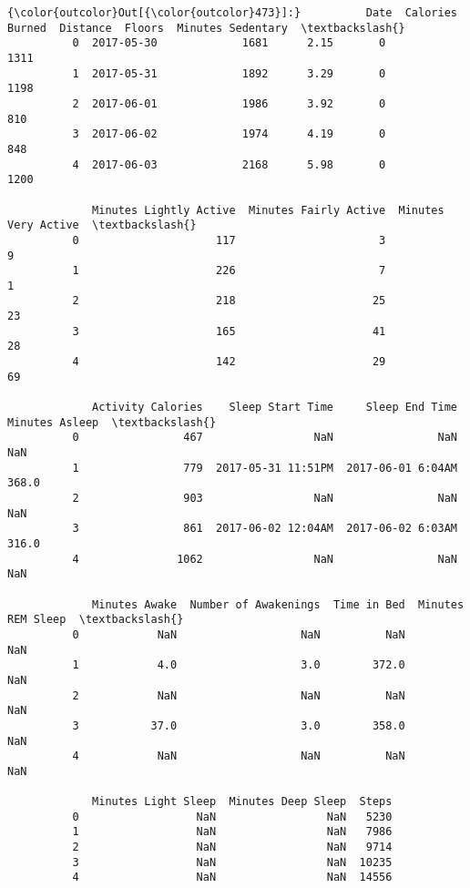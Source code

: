 \documentclass[11pt]{article}
\begin{document}
\begin{Verbatim}[commandchars=\\\{\}]
{\color{outcolor}Out[{\color{outcolor}473}]:}          Date  Calories Burned  Distance  Floors  Minutes Sedentary  \textbackslash{}
          0  2017-05-30             1681      2.15       0               1311   
          1  2017-05-31             1892      3.29       0               1198   
          2  2017-06-01             1986      3.92       0                810   
          3  2017-06-02             1974      4.19       0                848   
          4  2017-06-03             2168      5.98       0               1200   
          
             Minutes Lightly Active  Minutes Fairly Active  Minutes Very Active  \textbackslash{}
          0                     117                      3                    9   
          1                     226                      7                    1   
          2                     218                     25                   23   
          3                     165                     41                   28   
          4                     142                     29                   69   
          
             Activity Calories    Sleep Start Time     Sleep End Time  Minutes Asleep  \textbackslash{}
          0                467                 NaN                NaN             NaN   
          1                779  2017-05-31 11:51PM  2017-06-01 6:04AM           368.0   
          2                903                 NaN                NaN             NaN   
          3                861  2017-06-02 12:04AM  2017-06-02 6:03AM           316.0   
          4               1062                 NaN                NaN             NaN   
          
             Minutes Awake  Number of Awakenings  Time in Bed  Minutes REM Sleep  \textbackslash{}
          0            NaN                   NaN          NaN                NaN   
          1            4.0                   3.0        372.0                NaN   
          2            NaN                   NaN          NaN                NaN   
          3           37.0                   3.0        358.0                NaN   
          4            NaN                   NaN          NaN                NaN   
          
             Minutes Light Sleep  Minutes Deep Sleep  Steps  
          0                  NaN                 NaN   5230  
          1                  NaN                 NaN   7986  
          2                  NaN                 NaN   9714  
          3                  NaN                 NaN  10235  
          4                  NaN                 NaN  14556  
\end{Verbatim}
            
\end{document}
